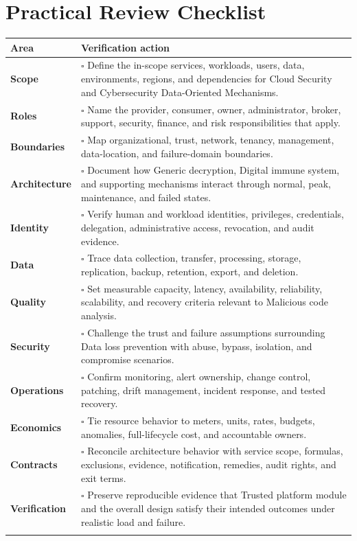 \documentclass[11pt]{article}
\begin{document}
\section{Practical Review Checklist}
\begin{longtable}{@{}>{\bfseries\color{Teal}}p{}>{\RaggedRight\arraybackslash}p{}@{}}
\toprule\textbf{Area} & \textbf{Verification action}\\\midrule\endhead
Scope & $\square$ Define the in-scope services, workloads, users, data, environments, regions, and dependencies for Cloud Security and Cybersecurity Data-Oriented Mechanisms. \\\addlinespace[2pt]
Roles & $\square$ Name the provider, consumer, owner, administrator, broker, support, security, finance, and risk responsibilities that apply. \\\addlinespace[2pt]
Boundaries & $\square$ Map organizational, trust, network, tenancy, management, data-location, and failure-domain boundaries. \\\addlinespace[2pt]
Architecture & $\square$ Document how Generic decryption, Digital immune system, and supporting mechanisms interact through normal, peak, maintenance, and failed states. \\\addlinespace[2pt]
Identity & $\square$ Verify human and workload identities, privileges, credentials, delegation, administrative access, revocation, and audit evidence. \\\addlinespace[2pt]
Data & $\square$ Trace data collection, transfer, processing, storage, replication, backup, retention, export, and deletion. \\\addlinespace[2pt]
Quality & $\square$ Set measurable capacity, latency, availability, reliability, scalability, and recovery criteria relevant to Malicious code analysis. \\\addlinespace[2pt]
Security & $\square$ Challenge the trust and failure assumptions surrounding Data loss prevention with abuse, bypass, isolation, and compromise scenarios. \\\addlinespace[2pt]
Operations & $\square$ Confirm monitoring, alert ownership, change control, patching, drift management, incident response, and tested recovery. \\\addlinespace[2pt]
Economics & $\square$ Tie resource behavior to meters, units, rates, budgets, anomalies, full-lifecycle cost, and accountable owners. \\\addlinespace[2pt]
Contracts & $\square$ Reconcile architecture behavior with service scope, formulas, exclusions, evidence, notification, remedies, audit rights, and exit terms. \\\addlinespace[2pt]
Verification & $\square$ Preserve reproducible evidence that Trusted platform module and the overall design satisfy their intended outcomes under realistic load and failure. \\\addlinespace[2pt]
\bottomrule
\end{longtable}
\end{document}
